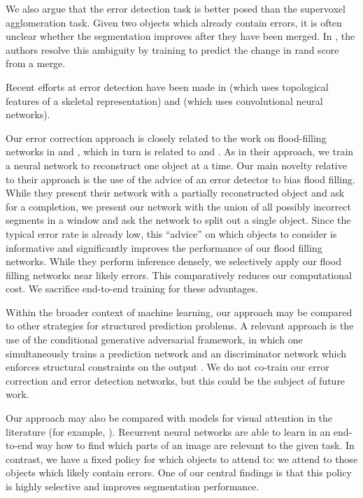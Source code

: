 \documentclass{article}
\begin{document}
We also argue that the error detection task is better posed than the supervoxel agglomeration task. Given two objects which already contain errors, it is often unclear whether the segmentation improves after they have been merged. In \cite{lash}, the authors resolve this ambiguity by training to predict the change in rand score from a merge.

Recent efforts at error detection have been made in \cite{multipass} (which uses topological features of a skeletal representation) and \cite{mergenet} (which uses convolutional neural networks).

Our error correction approach is closely related to the work on flood-filling networks in \cite{floodfilling} and \cite{multipass}, which in turn is related to \cite{recurrent_instance_seg_1} and \cite{recurrent_instance_seg_2}. As in their approach, we train a neural network to reconstruct one object at a time. Our main novelty relative to their approach is the use of the advice of an error detector to bias flood filling. While they present their network with a partially reconstructed object and ask for a completion, we present our network with the union of all possibly incorrect segments in a window and ask the network to split out a single object. Since the typical error rate is already low, this ``advice'' on which objects to consider is informative and significantly improves the performance of our flood filling networks. While they perform inference densely, we selectively apply our flood filling networks near likely errors. This comparatively reduces our computational cost. We sacrifice end-to-end training for these advantages.

Within the broader context of machine learning, our approach may be compared to other strategies for structured prediction problems. A relevant approach is the use of the conditional generative adversarial framework, in which one simultaneously trains a prediction network and an discriminator network which enforces structural constraints on the output \cite{cgan1,cgan2}. We do not co-train our error correction and error detection networks, but this could be the subject of future work. 

Our approach may also be compared with models for visual attention in the literature (for example, \cite{recurrent_attention}). Recurrent neural networks are able to learn in an end-to-end way how to find which parts of an image are relevant to the given task. In contrast, we have a fixed policy for which objects to attend to: we attend to those objects which likely contain errors. One of our central findings is that this policy is highly selective and improves segmentation performance.
\end{document}
